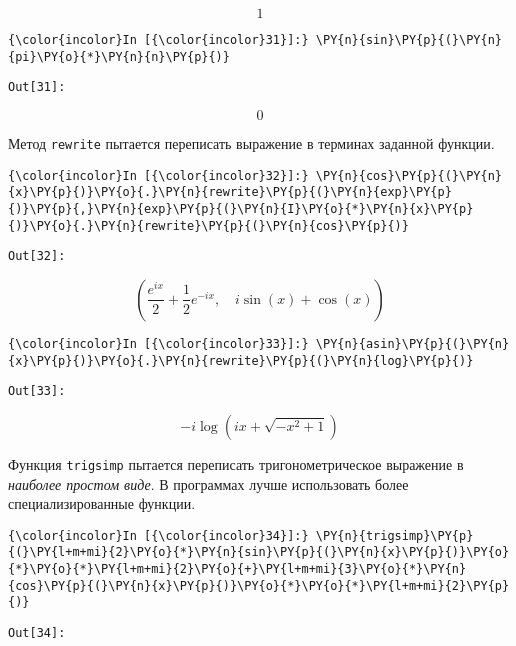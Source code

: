     \[1\]

    

    \begin{Verbatim}[commandchars=\\\{\}]
{\color{incolor}In [{\color{incolor}31}]:} \PY{n}{sin}\PY{p}{(}\PY{n}{pi}\PY{o}{*}\PY{n}{n}\PY{p}{)}
\end{Verbatim}
\texttt{\color{outcolor}Out[{\color{outcolor}31}]:}
    
    \[0\]

    

    Метод \texttt{rewrite} пытается переписать выражение в терминах заданной
функции.

    \begin{Verbatim}[commandchars=\\\{\}]
{\color{incolor}In [{\color{incolor}32}]:} \PY{n}{cos}\PY{p}{(}\PY{n}{x}\PY{p}{)}\PY{o}{.}\PY{n}{rewrite}\PY{p}{(}\PY{n}{exp}\PY{p}{)}\PY{p}{,}\PY{n}{exp}\PY{p}{(}\PY{n}{I}\PY{o}{*}\PY{n}{x}\PY{p}{)}\PY{o}{.}\PY{n}{rewrite}\PY{p}{(}\PY{n}{cos}\PY{p}{)}
\end{Verbatim}
\texttt{\color{outcolor}Out[{\color{outcolor}32}]:}
    
    \[\left ( \frac{e^{i x}}{2} + \frac{1}{2} e^{- i x}, \quad i \sin{\left (x \right )} + \cos{\left (x \right )}\right )\]

    

    \begin{Verbatim}[commandchars=\\\{\}]
{\color{incolor}In [{\color{incolor}33}]:} \PY{n}{asin}\PY{p}{(}\PY{n}{x}\PY{p}{)}\PY{o}{.}\PY{n}{rewrite}\PY{p}{(}\PY{n}{log}\PY{p}{)}
\end{Verbatim}
\texttt{\color{outcolor}Out[{\color{outcolor}33}]:}
    
    \[- i \log{\left (i x + \sqrt{- x^{2} + 1} \right )}\]

    

    Функция \texttt{trigsimp} пытается переписать тригонометрическое
выражение в \emph{наиболее простом виде}. В программах лучше
использовать более специализированные функции.

    \begin{Verbatim}[commandchars=\\\{\}]
{\color{incolor}In [{\color{incolor}34}]:} \PY{n}{trigsimp}\PY{p}{(}\PY{l+m+mi}{2}\PY{o}{*}\PY{n}{sin}\PY{p}{(}\PY{n}{x}\PY{p}{)}\PY{o}{*}\PY{o}{*}\PY{l+m+mi}{2}\PY{o}{+}\PY{l+m+mi}{3}\PY{o}{*}\PY{n}{cos}\PY{p}{(}\PY{n}{x}\PY{p}{)}\PY{o}{*}\PY{o}{*}\PY{l+m+mi}{2}\PY{p}{)}
\end{Verbatim}
\texttt{\color{outcolor}Out[{\color{outcolor}34}]:}
    
